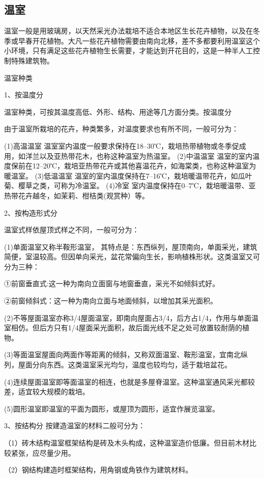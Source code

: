 \documentclass{ctexbook}
\begin{document}
\subsection{温室}
温室一般是用玻璃房，以天然采光办法栽培不适合本地区生长花卉植物，以及在冬季或早春开花植物。大凡一些花卉植物需要由南向北移，差不多都要利用温室这个小环境，只有满足这些花卉植物生长需要，才能达到开花目的，这是一种半人工控制特殊建筑物。

温室种类

1、按温度分

温室种类，可按其温度高低、外形、结构、用途等几方面分类。按温度分

由于温室所栽培的花卉，种类繁多，对温度要求也有所不同，一般可分为：

(1)高温温室 温室室内温度一般要求保持在18--30℃，栽培热带植物或冬季促成用，如洋兰以及亚热带花木，也称这种温室为热温室。
(2)中温温室 温室的室内温度保前在12--20℃，栽培亚热带花卉或其他喜温花卉，如海棠类，也称这种温室为暖温室。
(3)低温温室 温室的室内温度保持在7--16℃，栽培暖温带花卉，如瓜叶菊、樱草之类，可称为冷温室。
(4)冷室 室内温度保持在0--7℃，栽培暖温带、亚热带花卉越冬，如茉莉、柑桔类(观赏种）等。

2、按构造形式分

温室式样依屋顶式样之不同，一般可分为：

(1)单面温室又称半鞍形温室，
其特点是：东西纵列，屋顶南向，单面采光，建筑简便，室温较高。但因单向采光，盆花常偏向生长，影响植株形状。这类温室又可分为三种：

①前窗垂直式:这一种为南向立面窗与地窗垂直，采光不如倾斜式好。

②前窗倾斜式：这一种为南向立面与地面倾斜，以增加其采光面积。

(2)不等屋面温室亦称3/4屋面温室，即南向屋面占3/4，后方占1/4，作用与单面温室相仿。但后方只有1/4屋面采光面积，故后面光线不足之处可放置较耐荫的植物。

(3)等面温室屋面向两面作等距离的倾斜，又称双面温室、鞍形温室，宜南北纵列，屋面分向东西。这类温室采光均匀，温度也较均匀，适于栽培盆花。

(4)连续屋面温室即等面温室的相连，也就是多屋脊温室。这种温室通风采光都较差，适宜较大规模的栽培。

(5)圆形温室即温室的平面为圆形，或屋顶为圆形，适宜作展览温室。

3、按结构分
按建造温室的材料二般可分为：

（1）砖木结构温室框架结构是砖及木头构成，这种温室造价低廉。但目前木材比较紧张，应尽量少用。

（2）钢结构建造时框架结构，用角钢或角铁作为建筑材料。
\end{document}
